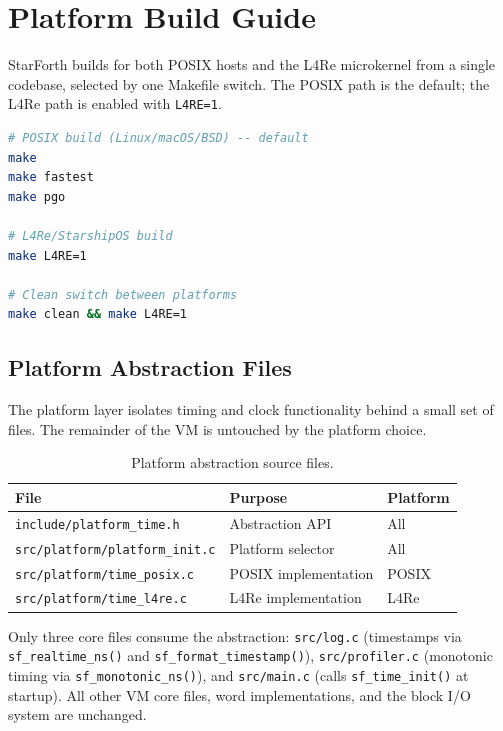 
\section{Platform Build Guide}

StarForth builds for both POSIX hosts and the L4Re microkernel from a single
codebase, selected by one Makefile switch. The POSIX path is the default; the
L4Re path is enabled with \texttt{L4RE=1}.

\begin{lstlisting}[language=bash]
# POSIX build (Linux/macOS/BSD) -- default
make
make fastest
make pgo

# L4Re/StarshipOS build
make L4RE=1

# Clean switch between platforms
make clean && make L4RE=1
\end{lstlisting}

\subsection{Platform Abstraction Files}

The platform layer isolates timing and clock functionality behind a small set
of files. The remainder of the VM is untouched by the platform choice.

\begin{table}[h]
\centering
\begin{tabular}{lll}
\toprule
File & Purpose & Platform \\
\midrule
\texttt{include/platform\_time.h} & Abstraction API & All \\
\texttt{src/platform/platform\_init.c} & Platform selector & All \\
\texttt{src/platform/time\_posix.c} & POSIX implementation & POSIX \\
\texttt{src/platform/time\_l4re.c} & L4Re implementation & L4Re \\
\bottomrule
\end{tabular}
\caption{Platform abstraction source files.}
\end{table}

Only three core files consume the abstraction: \texttt{src/log.c} (timestamps
via \texttt{sf\_realtime\_ns()} and \texttt{sf\_format\_timestamp()}),
\texttt{src/profiler.c} (monotonic timing via \texttt{sf\_monotonic\_ns()}),
and \texttt{src/main.c} (calls \texttt{sf\_time\_init()} at startup). All other
VM core files, word implementations, and the block I/O system are unchanged.

